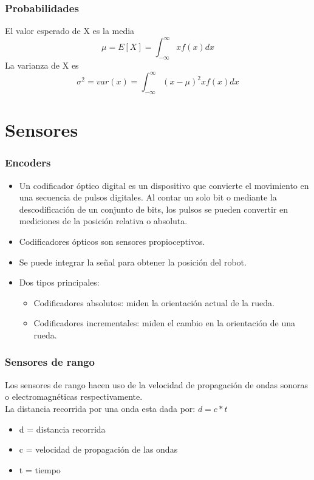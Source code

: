 \documentclass{beamer}
\begin{document}
\begin{frame}
\frametitle{Probabilidades}
El valor esperado de X es la media
$$\mu = E[X] = \int_{-\infty}^{\infty} xf(x) dx$$
La varianza de X es
$$\sigma^{2}= var(x) = \int_{-\infty}^{\infty} (x-\mu)^{2} xf(x) dx$$
\end{frame}

\section{Sensores}

\begin{frame}
\frametitle{Encoders}
\begin{itemize}
\item Un codificador óptico digital es un dispositivo que convierte el movimiento en una secuencia de pulsos digitales. Al contar un solo bit o mediante la descodificación de un conjunto de bits, los pulsos se pueden convertir en mediciones de la posición relativa o absoluta.
\item Codificadores ópticos son sensores propioceptivos.
\item Se puede integrar la señal para obtener la posición del robot.
\item Dos tipos principales:
\begin{itemize}
\item Codificadores absolutos: miden la orientación actual de la rueda.
\item Codificadores incrementales: miden el cambio en la orientación de una rueda.
\end{itemize}
\end{itemize}
\end{frame}

\begin{frame}
\frametitle{Sensores de rango}
Los sensores de rango hacen uso de la velocidad de propagación de ondas sonoras o electromagnéticas respectivamente.\\

La distancia recorrida por una onda esta dada por: $d = c*t$
\begin{itemize}
\item d = distancia recorrida
\item c = velocidad de propagación de las ondas
\item t = tiempo
\end{itemize}
\end{frame}
\end{document}
